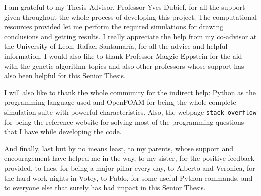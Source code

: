 \begin{acknowledgements}

I am grateful to my Thesis Advisor, Professor Yves Dubief, for all the support given throughout the whole process of developing this project. The computational resources provided let me perform the required simulations for drawing conclusions and getting results. I really appreciate the help from my co-advisor at the University of Leon, Rafael Santamaría, for all the advice and helpful information. I would also like to thank Professor Maggie Eppstein for the aid with the genetic algorithm topics and also other professors whose support has also been helpful for this Senior Thesis.

I will also like to thank the whole community for the indirect help: Python as the programming language used and OpenFOAM for being the whole complete simulation suite with powerful characteristics. Also, the webpage \texttt{stack-overflow} for being the reference website for solving most of the programming questions that I have while developing the code. 

And finally, last but by no means least, to my parents, whose support and encouragement have helped me in the way, to my sister, for the positive feedback provided, to Ines, for being a major pillar every day, to Alberto and Veronica, for the hard-work nights in Votey, to Pablo, for some useful Python commands, and to everyone else that surely has had impact in this Senior Thesis.

\end{acknowledgements}